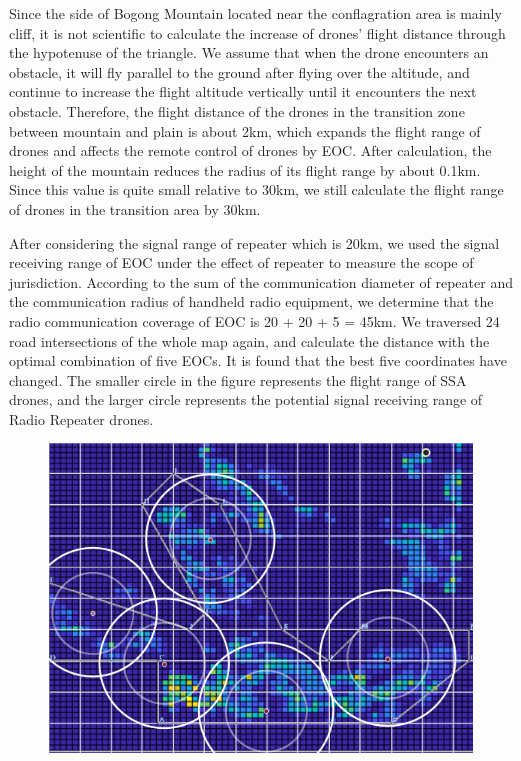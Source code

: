 \documentclass{mcmthesis}
\begin{document}
Since the side of Bogong Mountain located near the conflagration area is mainly cliff, it is not scientific to calculate the increase of drones' flight distance through the hypotenuse of the triangle. We assume that when the drone encounters an obstacle, it will fly parallel to the ground after flying over the altitude, and continue to increase the flight altitude vertically until it encounters the next obstacle. Therefore, the flight distance of the drones in the transition zone between mountain and plain is about 2km, which expands the flight range of drones and affects the remote control of drones by EOC. After calculation, the height of the mountain reduces the radius of its flight range by about 0.1km. Since this value is quite small relative to 30km, we still calculate the flight range of drones in the transition area by 30km.

After considering the signal range of repeater which is 20km, we used the signal receiving range of EOC under the effect of repeater to measure the scope of jurisdiction. According to the sum of the communication diameter of repeater and the communication radius of handheld radio equipment, we determine that the radio communication coverage of EOC is 20 + 20 + 5 = 45km. We traversed 24 road intersections of the whole map again, and calculate the distance with the optimal combination of five EOCs. It is found that the best five coordinates have changed. The smaller circle in the figure represents the flight range of SSA drones, and the larger circle represents the potential signal receiving range of Radio Repeater drones.

\begin{figure}[H]
  \centering
  \includegraphics[scale=0.4]{image/8.png}
  
\end{figure}
\end{document}
